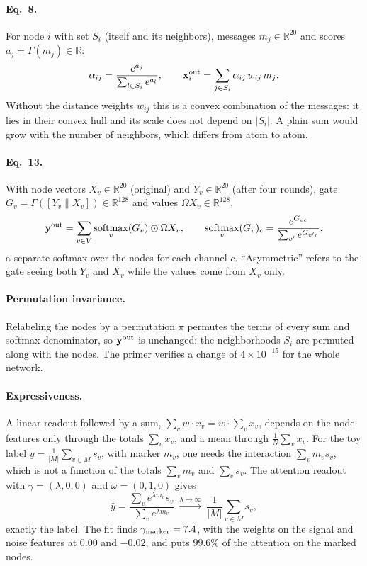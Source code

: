 \documentclass[11pt]{article}
\newcommand{\R}{\mathbb{R}}
\DeclareMathOperator{\softmax}{softmax}
\begin{document}
\paragraph{Eq.~8.} For node $i$ with set $S_i$ (itself and its neighbors), messages $m_j\in\R^{20}$ and scores $a_j=\Gamma(m_j)\in\R$:
\[
  \alpha_{ij}=\frac{e^{a_j}}{\sum_{l\in S_i}e^{a_l}},\qquad \mathbf x_i^{\rm out}=\sum_{j\in S_i}\alpha_{ij}\,w_{ij}\,m_j .
\]
Without the distance weights $w_{ij}$ this is a convex combination of the messages: it lies in their convex hull and its scale does not depend on $|S_i|$. A plain sum would grow with the number of neighbors, which differs from atom to atom.

\paragraph{Eq.~13.} With node vectors $X_v\in\R^{20}$ (original) and $Y_v\in\R^{20}$ (after four rounds), gate $G_v=\Gamma([Y_v\|X_v])\in\R^{128}$ and values $\Omega X_v\in\R^{128}$,
\[
  \mathbf y^{\rm out}=\sum_{v\in V}\softmax_v(G_v)\odot\Omega X_v,\qquad \softmax_v(G_v)_c=\frac{e^{G_{vc}}}{\sum_{v'}e^{G_{v'c}}},
\]
a separate softmax over the nodes for each channel $c$. ``Asymmetric'' refers to the gate seeing both $Y_v$ and $X_v$ while the values come from $X_v$ only.

\paragraph{Permutation invariance.} Relabeling the nodes by a permutation $\pi$ permutes the terms of every sum and softmax denominator, so $\mathbf y^{\rm out}$ is unchanged; the neighborhoods $S_i$ are permuted along with the nodes. The primer verifies a change of $4\times10^{-15}$ for the whole network.

\paragraph{Expressiveness.} A linear readout followed by a sum, $\sum_vw\cdot x_v=w\cdot\sum_vx_v$, depends on the node features only through the totals $\sum_vx_v$, and a mean through $\frac1N\sum_vx_v$. For the toy label $y=\frac1{|M|}\sum_{v\in M}s_v$, with marker $m_v$, one needs the interaction $\sum_vm_vs_v$, which is not a function of the totals $\sum_vm_v$ and $\sum_vs_v$. The attention readout with $\gamma=(\lambda,0,0)$ and $\omega=(0,1,0)$ gives
\[
  \hat y=\frac{\sum_ve^{\lambda m_v}s_v}{\sum_ve^{\lambda m_v}}\ \xrightarrow{\lambda\to\infty}\ \frac1{|M|}\sum_{v\in M}s_v,
\]
exactly the label. The fit finds $\gamma_{\rm marker}=7.4$, with the weights on the signal and noise features at $0.00$ and $-0.02$, and puts $99.6\%$ of the attention on the marked nodes.
\end{document}
